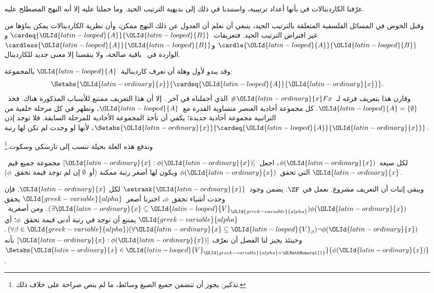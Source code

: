 \documentclass[../../../include/open-logic-section]{subfiles}
\begin{document}

عرّفنا الكاردينالات في
 بأنها أعداد
ترتيبية، واستندنا في ذلك إلى بديهية الترتيب الجيد. وما حملنا عليه إلا
أنه النهج المصطلح عليه.

وقبل الخوض في المسائل الفلسفية المتعلقة بالترتيب الجيد، ينبغي أن نعلم
أن العدول عن ذلك النهج ممكن، وأن نظرية الكاردينالات يمكن بناؤها من غير
افتراض الترتيب الجيد. فتعريفات~$\cardeq{\OLId{latin-looped}{A}}{\OLId{latin-looped}{B}}$ و$\cardle{\OLId{latin-looped}{A}}{\OLId{latin-looped}{B}}$
و$\cardless{\OLId{latin-looped}{A}}{\OLId{latin-looped}{B}}$ الواردة في~ باقية صالحة،
ولا ينقصنا إلا معنى جديد للكاردينال.

وقد يبدو لأول وهلة أن تعرف كاردينالية~$\OLId{latin-looped}{A}$ بالمجموعة:
\[
	\Setabs{\OLId{latin-ordinary}{x}}{\cardeq{\OLId{latin-looped}{A}}{\OLId{latin-ordinary}{x}}}.
\]
وقارن هذا بتعريف فرغه لـ~$\# \OLId{latin-ordinary}{x} Fx$ الذي أجملناه في آخر
. إلا أن هذا التعريف ممتنع للأسباب المذكورة
هناك. فخذ~$\OLId{latin-looped}{A}=\{\emptyset\}$. كل مجموعة أحادية العنصر متساوية القدرة
مع~$\OLId{latin-looped}{A}$، وتظهر في كل مرحلة خلفية من التراتبية مجموعة أحادية جديدة؛
يكفي أن تأخذ المجموعة الأحادية للمرحلة السابقة. فلا توجد إذن
$\Setabs{\OLId{latin-ordinary}{x}}{\cardeq{\OLId{latin-looped}{A}}{\OLId{latin-ordinary}{x}}}$، لأنها لو وجدت لم تكن لها رتبة.

وندفع هذه العلة بحيلة تنسب إلى تارسكي وسكوت.\footnote{تذكير: يجوز أن
تتضمن جميع الصيغ وسائط، ما لم ينص صراحة على خلاف ذلك.}

\begin{defn}
لكل صيغة~$\phi(\OLId{latin-ordinary}{x})$، اجعل~$[ \OLId{latin-ordinary}{x} : \phi(\OLId{latin-ordinary}{x})] $ مجموعة جميع قيم~$\OLId{latin-ordinary}{x}$ التي
تحقق~$\phi(\OLId{latin-ordinary}{x})$ ويكون لها أصغر رتبة ممكنة (أو~$\emptyset$ إن لم توجد
قيمة تحقق~$\phi$).
\end{defn}

ويبقى إثبات أن التعريف مشروع. نعمل في~$\ZF$. يضمن
 وجود~$\setrank{\OLId{latin-ordinary}{x}}$ لكل
$\OLId{latin-ordinary}{x}$. فإن وجدت أشياء تحقق~$\phi$، اخترنا أصغر~$\OLId{greek-variable}{alpha}$ يحقق
$(\exists \OLId{latin-ordinary}{x}\subseteq \OLId{latin-looped}{V}_\OLId{greek-variable}{alpha})\phi(\OLId{latin-ordinary}{x})$. ومن أصغرية~$\OLId{greek-variable}{alpha}$ يمتنع أن
توجد في رتبة أدنى قيمة تحقق~$\phi$؛ أي
$(\forall \beta \in \OLId{greek-variable}{alpha})(\forall \OLId{latin-ordinary}{x} \subseteq \OLId{latin-looped}{V}_\beta)
\lnot \phi(\OLId{latin-ordinary}{x})$. وحينئذ يجيز لنا الفصل أن نعرّف
$[\OLId{latin-ordinary}{x} : \phi(\OLId{latin-ordinary}{x})]$ بأنه~$\Setabs{\OLId{latin-ordinary}{x} \in \OLId{latin-looped}{V}_{\OLId{greek-variable}{alpha}+\OLMathNumeral{1}}}{\phi(\OLId{latin-ordinary}{x})}$.
\end{document}

